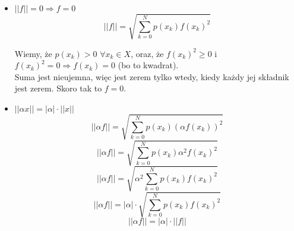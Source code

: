 \documentclass[a4paper]{article}
\begin{document}
\begin{itemize}
  \item $|| f || = 0 \Rightarrow f=0$
  $$|| f || = \sqrt{\sum\limits_{k=0}^{N}p(x_k)f(x_k)^2} $$
\begin{center}
	Wiemy, że $p(x_k) > 0$ $\forall x_k \in X$, oraz, że $f(x_k)^2 \geq 0$ i $f(x_k)^2=0 \Rightarrow f(x_k) = 0$ (bo to kwadrat).\\
	Suma jest nieujemna, więc jest zerem tylko wtedy, kiedy każdy jej składnik jest zerem. Skoro tak to $f=0$.
\end{center}
	\item $||\alpha x|| = | \alpha |\cdot ||x|| $
	 $$|| \alpha f || = \sqrt{\sum\limits_{k=0}^{N}p(x_k)(\alpha f(x_k))^2} $$
	 $$|| \alpha f || = \sqrt{\sum\limits_{k=0}^{N}p(x_k)\alpha^2 f(x_k)^2} $$
	 $$|| \alpha f || = \sqrt{\alpha^2 \sum\limits_{k=0}^{N}p(x_k) f(x_k)^2} $$
     $$|| \alpha f || = | \alpha | \cdot \sqrt{\sum\limits_{k=0}^{N}p(x_k) f(x_k)^2} $$
     $$|| \alpha f || = | \alpha | \cdot || f || $$


\end{itemize}
\end{document}

